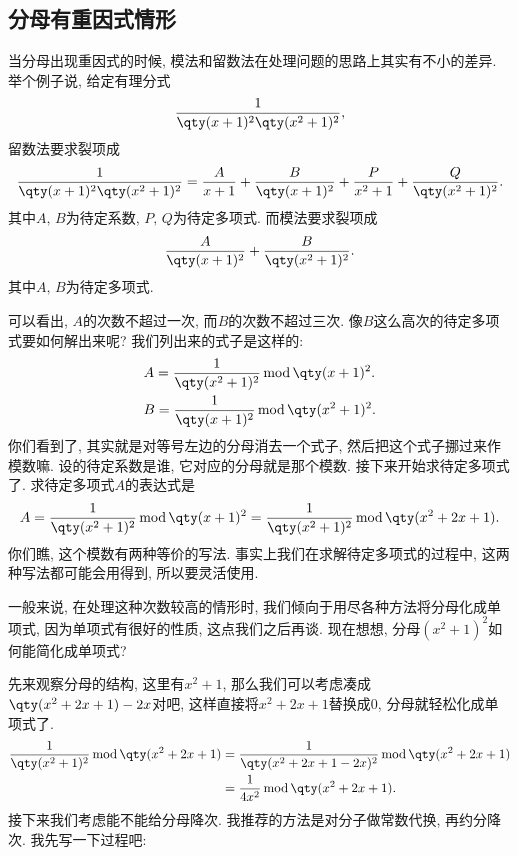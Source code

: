 \documentclass{ctexbook}
\newcommand{\m}{\,\mathrm{mod}\,}
\begin{document}
{\subsection{分母有重因式情形}
当分母出现重因式的时候, 模法和留数法在处理问题的思路上其实有不小的差异. 举个例子说, 给定有理分式
\begin{align*}
\frac{1}{\qty(x+1)^{2}\qty(x^{2}+1)^{2}}
,\end{align*}
留数法要求裂项成
\begin{align*}
\frac{1}{\qty(x+1)^{2}\qty(x^{2}+1)^{2}}=\frac{A}{x+1}+\frac{B}{\qty(x+1)^{2}}+\frac{P}{x^{2}+1}+\frac{Q}{\qty(x^{2}+1)^{2}}
.\end{align*}
其中$A,\,B$为待定系数, $P,\,Q$为待定多项式. 而模法要求裂项成
\begin{align*}
\frac{A}{\qty(x+1)^{2}}+\frac{B}{\qty(x^{2}+1)^{2}}
.\end{align*}
其中$A,\,B$为待定多项式. \par
可以看出, $A$的次数不超过一次, 而$B$的次数不超过三次. 像$B$这么高次的待定多项式要如何解出来呢? 我们列出来的式子是这样的: 
\begin{align*}
{}&A=\frac{1}{\qty(x^{2}+1)^{2}}\m\qty(x+1)^{2}.\\
{}&B=\frac{1}{\qty(x+1)^{2}}\m\qty(x^{2}+1)^{2}
.\end{align*}
你们看到了, 其实就是对等号左边的分母消去一个式子, 然后把这个式子挪过来作模数嘛. 设的待定系数是谁, 它对应的分母就是那个模数. 
接下来开始求待定多项式了. 求待定多项式$A$的表达式是
\begin{align*}
A=\frac{1}{\qty(x^{2}+1)^{2}}\m\qty(x+1)^{2}=\frac{1}{\qty(x^{2}+1)^{2}}\m\qty(x^{2}+2x+1)
.\end{align*}
你们瞧, 这个模数有两种等价的写法. 事实上我们在求解待定多项式的过程中, 这两种写法都可能会用得到, 所以要灵活使用. \par
一般来说, 在处理这种次数较高的情形时, 我们倾向于用尽各种方法将分母化成单项式, 因为单项式有很好的性质, 这点我们之后再谈. 现在想想, 分母$(x^{2}+1)^{2}$如何能简化成单项式? \par
先来观察分母的结构, 这里有$x^{2}+1$, 那么我们可以考虑凑成$\qty(x^{2}+2x+1)-2x$对吧, 这样直接将$x^{2}+2x+1$替换成$0$, 分母就轻松化成单项式了. 
\begin{align*}
\frac{1}{\qty(x^{2}+1)^{2}}\m\qty(x^{2}+2x+1)={}&\frac{1}{\qty(x^{2}+2x+1-2x)^{2}}\m\qty(x^{2}+2x+1)\\
={}&\frac{1}{4x^{2}}\m\qty(x^{2}+2x+1)
.\end{align*}
接下来我们考虑能不能给分母降次. 我推荐的方法是对分子做常数代换, 再约分降次. 我先写一下过程吧: 
}
\end{document}
